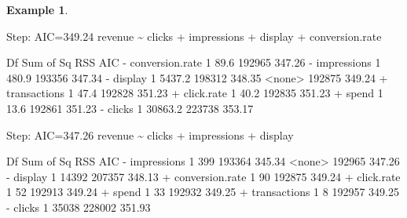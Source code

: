 \documentclass[
  11pt,
]{book}
\makeatletter
\newenvironment{Shaded}{}{}
\newcommand{\DecValTok}[1]{#1}
\newcommand{\FloatTok}[1]{#1}
\newcommand{\NormalTok}[1]{#1}
\newcommand{\OtherTok}[1]{\textcolor[rgb]{0.39,0.39,0.39}{#1}}
\newcommand{\SpecialCharTok}[1]{\textcolor[rgb]{0.39,0.39,0.39}{#1}}
\newenvironment{kframe}{%
\medskip{}
\setlength{\fboxsep}{.8em}
 \def\at@end@of@kframe{}%
 \ifinner\ifhmode%
  \def\at@end@of@kframe{\end{minipage}}%
  \begin{minipage}{\columnwidth}%
 \fi\fi%
 \def\FrameCommand##1{\hskip\@totalleftmargin \hskip-\fboxsep
 \colorbox{shadecolor}{##1}\hskip-\fboxsep
     \hskip-\linewidth \hskip-\@totalleftmargin \hskip\columnwidth}%
 \MakeFramed {\advance\hsize-\width
   \@totalleftmargin\z@ \linewidth\hsize
   \@setminipage}}%
 {\par\unskip\endMakeFramed%
 \at@end@of@kframe}
\renewenvironment{Shaded}{\begin{kframe}}{\end{kframe}}
\theoremstyle{definition}
\theoremstyle{definition}
\newtheorem{example}{Example}[chapter]
\theoremstyle{definition}
\theoremstyle{definition}
\theoremstyle{remark}
\makeatother
\begin{document}
\begin{example}
\begin{Shaded}
\begin{Highlighting}[]
\NormalTok{   Step}\SpecialCharTok{:}\NormalTok{  AIC}\OtherTok{=}\FloatTok{349.24}
\NormalTok{   revenue }\SpecialCharTok{\textasciitilde{}}\NormalTok{ clicks }\SpecialCharTok{+}\NormalTok{ impressions }\SpecialCharTok{+}\NormalTok{ display }\SpecialCharTok{+}\NormalTok{ conversion.rate}
   
\NormalTok{                     Df Sum of Sq    RSS    AIC}
   \SpecialCharTok{{-}}\NormalTok{ conversion.rate  }\DecValTok{1}      \FloatTok{89.6} \DecValTok{192965} \FloatTok{347.26}
   \SpecialCharTok{{-}}\NormalTok{ impressions      }\DecValTok{1}     \FloatTok{480.9} \DecValTok{193356} \FloatTok{347.34}
   \SpecialCharTok{{-}}\NormalTok{ display          }\DecValTok{1}    \FloatTok{5437.2} \DecValTok{198312} \FloatTok{348.35}
   \SpecialCharTok{\textless{}}\NormalTok{none}\SpecialCharTok{\textgreater{}}                         \DecValTok{192875} \FloatTok{349.24}
   \SpecialCharTok{+}\NormalTok{ transactions     }\DecValTok{1}      \FloatTok{47.4} \DecValTok{192828} \FloatTok{351.23}
   \SpecialCharTok{+}\NormalTok{ click.rate       }\DecValTok{1}      \FloatTok{40.2} \DecValTok{192835} \FloatTok{351.23}
   \SpecialCharTok{+}\NormalTok{ spend            }\DecValTok{1}      \FloatTok{13.6} \DecValTok{192861} \FloatTok{351.23}
   \SpecialCharTok{{-}}\NormalTok{ clicks           }\DecValTok{1}   \FloatTok{30863.2} \DecValTok{223738} \FloatTok{353.17}
   
\NormalTok{   Step}\SpecialCharTok{:}\NormalTok{  AIC}\OtherTok{=}\FloatTok{347.26}
\NormalTok{   revenue }\SpecialCharTok{\textasciitilde{}}\NormalTok{ clicks }\SpecialCharTok{+}\NormalTok{ impressions }\SpecialCharTok{+}\NormalTok{ display}
   
\NormalTok{                     Df Sum of Sq    RSS    AIC}
   \SpecialCharTok{{-}}\NormalTok{ impressions      }\DecValTok{1}       \DecValTok{399} \DecValTok{193364} \FloatTok{345.34}
   \SpecialCharTok{\textless{}}\NormalTok{none}\SpecialCharTok{\textgreater{}}                         \DecValTok{192965} \FloatTok{347.26}
   \SpecialCharTok{{-}}\NormalTok{ display          }\DecValTok{1}     \DecValTok{14392} \DecValTok{207357} \FloatTok{348.13}
   \SpecialCharTok{+}\NormalTok{ conversion.rate  }\DecValTok{1}        \DecValTok{90} \DecValTok{192875} \FloatTok{349.24}
   \SpecialCharTok{+}\NormalTok{ click.rate       }\DecValTok{1}        \DecValTok{52} \DecValTok{192913} \FloatTok{349.24}
   \SpecialCharTok{+}\NormalTok{ spend            }\DecValTok{1}        \DecValTok{33} \DecValTok{192932} \FloatTok{349.25}
   \SpecialCharTok{+}\NormalTok{ transactions     }\DecValTok{1}         \DecValTok{8} \DecValTok{192957} \FloatTok{349.25}
   \SpecialCharTok{{-}}\NormalTok{ clicks           }\DecValTok{1}     \DecValTok{35038} \DecValTok{228002} \FloatTok{351.93}
   

\end{Highlighting}
\end{Shaded}
\end{example}
\end{document}
